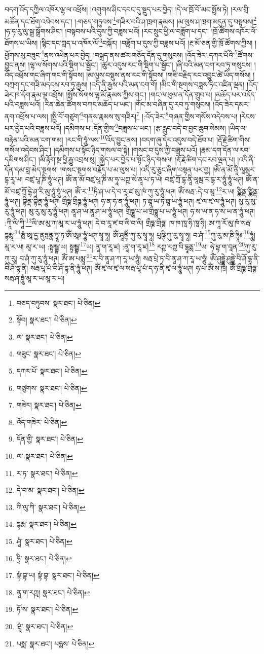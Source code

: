 བདག་འོད་དཀྱིལ་འཁོར་ལྷ་ལ་འཕྲོས། །འགུགས་ཤིང་དབང་དུ་སྡུད་པར་བྱེད། །དེ་ལ་ཁྲོ་བོ་མང་སྤྲོས་ཏེ། །རལ་གྲི་མཚོན་དང་ཐོག་འབེབས་དང་། །:གཅད་གཏུབས་\footnote{བཅད་བཏུབས་  སྣར་ཐང་།  པེ་ཅིན། }གཟིར་བའི་ཤ་ཁྲག་རྣམས། །མ་ལུས་ཤ་ཁྲག་མདུན་དུ་བསྟབས།\footnote{སྟོབ།  སྣར་ཐང་།  པེ་ཅིན། } །ཧ་ཧ་རུ་ལུ་སྒྲ་སྒྲོགས་ཤིང་། །བསྟབས་པའི་དུས་ཀྱི་བཟླས་པའོ། །རང་སྲུང་ཕྱི་ལ་བཟློག་པ་དང་། །ཁྲོ་ཚོགས་འཁོར་ལོ་ཐོགས་པ་ཡིས། །སྙིང་དང་ཀླད་པ་འཁོར་ལོ་\footnote{ལ་  སྣར་ཐང་།  པེ་ཅིན། }བསྐོར། །བཟློག་པ་དུས་ཀྱི་བཟླས་པའོ། །རྔ་མོ་ཅན་གྱི་ཁྲོ་ཚོགས་ཀྱིས། །ཕྱོགས་སུ་བཟུང་\footnote{གཟུང་  སྣར་ཐང་།  པེ་ཅིན། }ནས་འཕེན་པར་བྱེད། །བསྐྲད་ནས་ཚར་གཅོད་དོན་དུ་གསུངས། །འོད་ཟེར་:དཀར་པོའི་\footnote{དཀར་པོ་  སྣར་ཐང་།  པེ་ཅིན། }ཚོགས་བྱུང་ནས། །ལྷ་ལ་སོགས་པའི་སྡིག་པ་སྦྱོང་། །ཚུར་འདུས་རང་གི་སྡིག་པ་སྦྱོང་། །ཞི་བའི་མན་ངག་རབ་ཏུ་གསུངས། །འོད་འཕྲོས་གང་ཞིག་གང་གི་སྟོབས། །མ་ལུས་བསྡུས་ནས་རང་གི་སྟོབས། །གཟི་བརྗིད་རང་འབྱུང་ཚེ་ཡིད་གསོས། །བཀྲག་དང་གཟི་མདངས་རབ་ཏུ་རྒྱས། །འདི་ནི་རྒྱས་པའི་མན་ངག་གོ། །མིང་གི་སྔགས་བཟླས་ཏིང་འཛིན་ལྡན། །འོད་ཟེར་ཁ་དོག་རྣམ་ལྔ་འཕྲོས། །སྤོས་སོགས་ལྷ་མོ་རྣམས་ཀྱིས་གང་། །གང་ལ་ཕུལ་ན་དོན་གྲུབ་པ། །མཆོད་པར་འདོད་པའི་བཟླས་པའོ། །རིན་ཆེན་ཚོགས་བཀང་མཆོད་པ་ཡང་། །གོང་མ་བཞིན་དུ་རབ་ཏུ་གསུངས། །འོད་ཟེར་དམར་ནག་འཕྲོས་པ་ལས། །སྤྱི་བོ་གཙུག་\footnote{གཙུགས་  སྣར་ཐང་།  པེ་ཅིན། }གནས་རྣམས་སུ་གཟིར།\footnote{གཟེར།  སྣར་ཐང་།  པེ་ཅིན། } །:འོད་ཟེར་\footnote{འོད་གཟེར་  པེ་ཅིན། }གཞན་གྱིས་གསོས་འདེབས་པ། །རེངས་པར་བྱེད་པའི་བཟླས་པའོ། །དམིགས་པ་:དོན་གྱིས་\footnote{དོན་གྱི་  སྣར་ཐང་།  པེ་ཅིན། }བཟླས་པ་ཡང་། །རྩ་རླུང་བདེ་བ་བྱང་ཆུབ་སེམས། །ཡིད་ལ་བརྟེན་པའི་མན་ངག་གམ། །རང་གི་ཧཱུཾ་ལས་\footnote{ལ་  སྣར་ཐང་།  པེ་ཅིན། }འོད་བྱུང་ནས། །བདག་ཞུ་དེར་འདུས་བདེ་ཐོབ་པ། །རྡོ་རྗེ་ཚིག་གིས་གསོལ་འདེབས་ཤིང་། །དམིགས་པ་སྟོང་ཉིད་གསལ་བ་སྟེ། །གསང་བ་དུས་ཀྱི་བཟླས་པའོ། །རྣམ་དག་དོན་ལ་རབ་དམིགས་ཤིང་། །མི་རྟོག་སྔ་ཕྱི་རྒྱུ་འབྲས་སུ། །སྐྱེད་པར་བྱེད་པ་སྟོང་ཉིད་གསལ། །རྡོ་རྗེ་ཚིག་དང་རབ་ལྡན་པ། །འདི་ནི་དོན་དམ་བླ་མེད་སྔགས། །གསང་སྔགས་བརྗོད་པ་མ་ལུས་པ། །འདི་རུ་ཅུང་ཞིག་བསྟན་པར་བྱ། །ཨོཾ་ན་མོ་ནཱི་ལཱམྦར་དྷ་རཱ་ཡ། བཛྲ་པཱ་ཎི་ཧཱུཾ་ཕཊ། ཨོཾ་ན་མོ་བཛྲ་པཱ་ཎི་མ་ཧཱ་ཡཀྵ་སེ་ནཱ་པ་ཏ་ཡེ། བཛྲ་ཀྲོ་དྷ་ནཱི་ལཱམྦ་ར་དྷ་ར་ཧཱུཾ་ཧཱུཾ་ཕཊ། ཨོཾ་ན་མོ་བཛྲ་ཀྲོ་དྷེ་ཤྭ་རི་མུ་ཧཱུཾ་ཧཱུཾ་ཕཊ། ཨོཾ་ར་\footnote{ར་ཏ་  སྣར་ཐང་།  པེ་ཅིན། }ཏི་ཤ་ཡ་དེ་བ་རཱ་ཛ་མུ་ཁཾ་ཀུ་རུ་ཧཱུཾ་ཕཊ། ཨོཾ་སརྦ་:དེ་བ་མཱ་\footnote{དེ་བ་མ་  སྣར་ཐང་།  པེ་ཅིན། }ར་ཡ། ཙྪིནྡ་ཙྪིནྡ་ཧཱུཾ་ཕཊ། བྷིནྡ་བྷིནྡ་ཧཱུཾ་ཕཊ། གྲྀཧྞ་གྲྀཧྞ་ཧཱུཾ་ཕཊ། ཧ་ན་ཧ་ན་ཧཱུཾ་ཕཊ། ཏ་ཐཱ་ཡ་ཏ་ཐཱ་ཡ་ཧཱུཾ་ཕཊ། ཛྭ་ལ་ཛྭ་ལ་ཧཱུཾ་ཕཊ། སུ་རུ་སུ་རུ་ཧཱུཾ་ཕཊ། མུ་རུ་མུ་རུ་ཧཱུཾ་ཕཊ། ནཱ་ཤ་ཡ་ནཱ་ཤ་ཡ་ཧཱུཾ་ཕཊ། གྲྀཧྞཱ་པ་ཡ་གྲྀཧྞཱ་པ་ཡ་ཧཱུཾ་ཕཊ། ཧ་ས་ཡ་ན་ཧ་ས་ཡ་ན་ཧཱུཾ་ཕཊ། :ཀཱི་ལི་ཀཱི་\footnote{ཀི་ལུ་ཀི་  སྣར་ཐང་།  པེ་ཅིན། }ལི་ཨ་མུ་ཀ་མཱ་ར་ཡ་ཧཱུཾ་ཕཊ། དེ་བ་རཱ་ཛ་བ་ལི་བ་ལི། གྲྀཧྞ་གྲྀཧྞ། ཁ་ཁ་ཁཱ་ཧི་ཁཱ་ཧི། ཨ་ཀཱ་རོ་མུ་ཁཾ་སརྦ་དྷརྨཱ་\footnote{དྷརྨ་  སྣར་ཐང་།  པེ་ཅིན། }ཎཱཾ་ཨཱ་དྱ་ནུཏྤནྣ་ཏྭཱ་ཏ་ཨོཾ་ཨཱཿ་ཧཱུཾ་ཕཊ་སྭཱ་ཧཱ། ཨོཾ་ཤཱནྟིཾ་ཀུ་རུ་སྭཱ་ཧཱ། པུཥྚི་ཀུ་རུ་སྭཱ་ཧཱ། བ་ཤཾ་\footnote{ཤཱཾ་  སྣར་ཐང་།  པེ་ཅིན། }ཀུ་རུ་མ་ཎི་ཧྲཱིཿ་\footnote{ཧྲི་  སྣར་ཐང་།  པེ་ཅིན། }ཧཱུཾ། མཱ་ར་ཡ། མཱ་ར་ཡ། :སྟྭམྦྷ་ཡ། སྟྭམྦྷ་\footnote{སྟཾ་བྷ་ཡ། སྟཾ་བྷ་  སྣར་ཐང་།  པེ་ཅིན། }ཡ། ནཱ་ག་རཱ་ཛ། :ནཱ་ག་རཱ་ཛ།\footnote{ནཱ་ག་རཀྵ།  སྣར་ཐང་།  པེ་ཅིན། } རཀྵ་རཀྵ་བི་དྷཱནྶ་\footnote{ཏོ་ས་  སྣར་ཐང་།  པེ་ཅིན། }ཡ། ཧེ་བྷ་ག་བཱན་\footnote{ཝཱཾ་  སྣར་ཐང་།  པེ་ཅིན། }ཀུ་རུ་ཀུ་རུ། བ་ཤཾ་ཀུ་རུ་ཧཱུཾ་ཕཊ། ཨོཾ་ཨ་པམྨཱ་\footnote{པསྨ་  སྣར་ཐང་། པདྨས་  པེ་ཅིན། }ར་བི་ནཱ་ཤ་ཀ་རཱ་ཡ་ཧཱུཾ། སརྦ་པྲེ་ཏ་བི་ནཱ་ཤ་ཀ་རཱ་ཡ་ཧཱུཾ། ཨོཾ་ཤུདྡྷེ་ཤུདྡྷེ་བི་ཤོ་དྷ་ནི་བི་ཤོ་དྷ་ནི། སརྦ་པཱ་པཾ་བི་ཤོ་དྷ་ནི་ཧཱུཾ་ཕཊ། ཨོཾ་ཛྭ་ལ་ཛྭ་ལ་སརྦ་པཱ་པཾ་ད་ཧ་ནི་ཛྭ་ལ་ཧཱུཾ་ཕཊ། ཧ་པ་ཨོཾ་ས་ཁྲི། ཨོཾ་གྲྀཧྞ་གྲྀཧྞ་སརྦ་ཤ་ཏྲཱུཾ་མཱ་ར་ཡ་མཱ་ར་ཡ། 